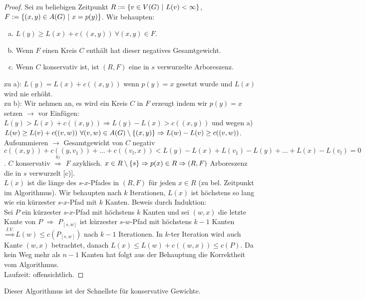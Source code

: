 \begin{proof}
	Sei zu beliebigen Zeitpunkt $R := \{v\in V(G) ~\vert~ L(v) < \infty\}$, $F := \{(x,y)\in A(G)~\vert~x=p(y)\}$. Wir behaupten:
	\begin{enumerate}[a)]
		\item $L(y) \ge L(x) + c((x,y)) ~\forall (x,y)\in F$.
		\item Wenn $F$ einen Kreis $C$ enthält hat dieser negatives Gesamtgewicht.
		\item Wenn $C$ konservativ ist, ist $(R,F)$ eine in $s$ verwurzelte Arboreszenz.
	\end{enumerate}
	zu a): $L(y) = L(x) + c((x,y))$ wenn $p(y) = x$ gesetzt wurde und $L(x)$ wird nie erhöht.\\
	zu b): Wir nehmen an, es wird ein Kreis $C$ in $F$ erzeugt indem wir $p(y) = x$ setzen $\to$ vor Einfügen: $L(y) > L(x) + c((x,y)) \Rightarrow L(y) - L(x) > c((x,y))$ und wegen a) $L(w) \ge L(v) + c((v,w))~\forall (v,w) \in A(G)\setminus \{(x,y)\} \Rightarrow L(w) - L(v) \ge c((v,w))$. Aufsummieren $\to$ Gesamtgewicht von $C$ negativ $c((x,y)) + c((y, v_1)) + ... + c((v_l,x)) < L(y) - L(x) + L(v_1) - L(y) + ... + L(x) - L(v_l) = 0$. $C$ konservativ $\overset{b)}{\Rightarrow}$ $F$ azyklisch. $x\in R\setminus \{s\} \Rightarrow p(x) \in R \Rightarrow (R,F)$ Arboreszenz die in $s$ verwurzelt [c)].\\
	$L(x)$ ist die länge des $s$-$x$-Pfades in $(R,F)$ für jeden $x\in R$ (zu bel. Zeitpunkt im Algorithmus). Wir behaupten nach $k$ Iterationen, $L(x)$ ist höchstens so lang wie ein kürzester $s$-$x$-Pfad mit $k$ Kanten. Beweis durch Induktion:\\
	Sei $P$ ein kürzester $s$-$x$-Pfad mit höchstens $k$ Kanten und sei $(w,x)$ die letzte Kante von $P$ $\Rightarrow$ $P_{[s,w]}$ ist kürzester $s$-$w$-Pfad mit höchstens $k-1$ Kanten $\overset{I.V.}{\Rightarrow} L(w) \le c(P_{[s,w]})$ nach $k-1$ Iterationen. In $k$-ter Iteration wird auch Kante $(w,x)$ betrachtet, danach $L(x) \le L(w) + c((w,x)) \le c(P)$. Da kein Weg mehr als $n-1$ Kanten hat folgt aus der Behauptung die Korrektheit vom Algorithmus.\\
	Laufzeit: offensichtlich.
\end{proof}
\begin{rem}
	Dieser Algorithmus ist der Schnellste für konservative Gewichte.
\end{rem}